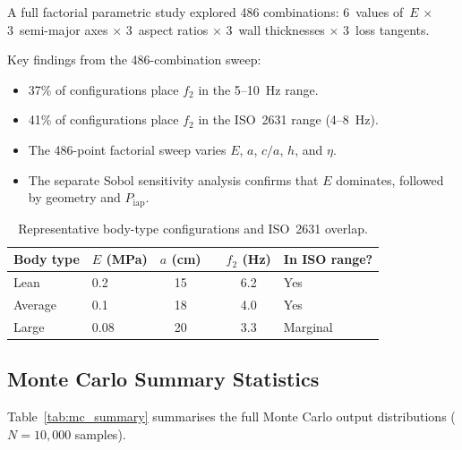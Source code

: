\documentclass[12pt]{article}
\begin{document}
A full factorial parametric study explored 486 combinations:
6~values of~$E$ $\times$ 3~semi-major axes $\times$ 3~aspect ratios $\times$
3~wall thicknesses $\times$ 3~loss tangents.

Key findings from the 486-combination sweep:
\begin{itemize}[nosep]
  \item 37\% of configurations place $f_{2}$ in the 5--\SI{10}{\hertz} range.
  \item 41\% of configurations place $f_{2}$ in the ISO~2631 range (4--\SI{8}{\hertz}).
  \item The 486-point factorial sweep varies $E$, $a$, $c/a$, $h$, and $\eta$.
  \item The separate Sobol sensitivity analysis confirms that $E$ dominates,
    followed by geometry and $P_{\mathrm{iap}}$.
\end{itemize}

\begin{table}[htbp]
\centering
\caption{Representative body-type configurations and ISO~2631 overlap.}
\label{tab:iso_body}
\begin{tabular}{@{}llSlSl@{}}
\toprule
{Body type} & {$E$ (\si{\mega\pascal})} & {$a$ (\si{\centi\metre})} & {} &
  {$f_{2}$ (\si{\hertz})} & {In ISO range?} \\
\midrule
Lean    & 0.2  & 15 && 6.2 & Yes \\
Average & 0.1  & 18 && 4.0 & Yes \\
Large   & 0.08 & 20 && 3.3 & Marginal \\
\bottomrule
\end{tabular}
\end{table}


\subsection{Monte Carlo Summary Statistics}
\label{sec:mc_summary}

Table~\ref{tab:mc_summary} summarises the full Monte Carlo output distributions
($N = 10{,}000$ samples).
\end{document}
